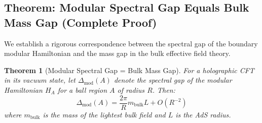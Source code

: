 \documentclass[12pt,a4paper]{article}
\newtheorem{theorem}{Theorem}[section]
\begin{document}
\subsection{Theorem: Modular Spectral Gap Equals Bulk Mass Gap (Complete Proof)}

We establish a rigorous correspondence between the spectral gap of the boundary modular Hamiltonian and the mass gap in the bulk effective field theory.

\begin{theorem}[Modular Spectral Gap = Bulk Mass Gap]\label{thm:modular-mass-gap}
For a holographic CFT in its vacuum state, let $\Delta_{\text{mod}}(A)$ denote the spectral gap of the modular Hamiltonian $H_A$ for a ball region $A$ of radius $R$. Then:
\begin{equation}
\Delta_{\text{mod}}(A) = \frac{2\pi}{R} m_{\text{bulk}} L + O(R^{-2})
\end{equation}
where $m_{\text{bulk}}$ is the mass of the lightest bulk field and $L$ is the AdS radius.
\end{theorem}
\end{document}
